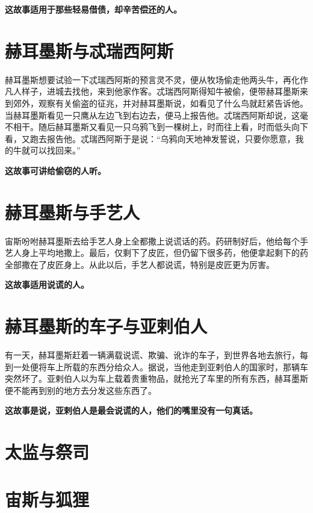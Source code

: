 {\bfseries \color{red}这故事适用于那些轻易借债，却辛苦偿还的人。}

\section{赫耳墨斯与忒瑞西阿斯}

赫耳墨斯想要试验一下忒瑞西阿斯的预言灵不灵，便从牧场偷走他两头牛，再化作凡人样子，进城去找他，来到他家作客。忒瑞西阿斯得知牛被偷，便带赫耳墨斯来到郊外，观察有关偷盗的征兆，并对赫耳墨斯说，如看见了什么鸟就赶紧告诉他。当赫耳墨斯看见一只鹰从左边飞到右边去，便马上报告他。忒瑞西阿斯却说，这毫不相干。随后赫耳墨斯又看见一只乌鸦飞到一棵树上，时而往上看，时而低头向下看，又跑去报告他。忒瑞西阿斯于是说：“乌鸦向天地神发誓说，只要你愿意，我的牛就可以找回来。”

{\bfseries \color{red}这故事可讲给偷窃的人听。}

\section{赫耳墨斯与手艺人}

宙斯吩咐赫耳墨斯去给手艺人身上全都撒上说谎话的药。药研制好后，他给每个手艺人身上平均地撒上。最后，仅剩下了皮匠，但仍留下很多药，他便拿起剩下的药全部撒在了皮匠身上。从此以后，手艺人都说谎，特别是皮匠更为厉害。

{\bfseries \color{red}这故事适用说谎的人。}

\section{赫耳墨斯的车子与亚剌伯人}

有一天，赫耳墨斯赶着一辆满载说谎、欺骗、讹诈的车子，到世界各地去旅行，每到一处便将车上所载的东西分给众人。据说，当他走到亚剌伯人的国家时，那辆车突然坏了。亚剌伯人以为车上载着贵重物品，就抢光了车里的所有东西，赫耳墨斯便不能再到别的地方去分发这些东西了。

{\bfseries \color{red}这故事是说，亚剌伯人是最会说谎的人，他们的嘴里没有一句真话。}

\section{太监与祭司}



{\bfseries \color{red}}

\section{宙斯与狐狸}

